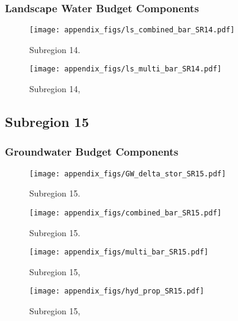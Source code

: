 \subsubsection{Landscape Water Budget Components}
\begin{figure}[ht]
\centerline{\texttt{[image: appendix\_figs/ls\_combined\_bar\_SR14.pdf]}}
\caption{\LSCombinedTextOne Subregion 14.\LSCombinedTextTwo}
\label{fig:LS_budget_SR14}
\end{figure}
\newpage

\begin{landscape}
\begin{figure}[ht]
\centerline{\texttt{[image: appendix\_figs/ls\_multi\_bar\_SR14.pdf]}}
\caption{\LSMultiTextOne Subregion 14,\LSMultiTextTwo}
\label{fig:multi_LS_budget_SR14}
\end{figure}
\newpage
\end{landscape}

\subsection{Subregion 15}
\subsubsection{Groundwater Budget Components}
\begin{figure}[h]
\centerline{\texttt{[image: appendix\_figs/GW\_delta\_stor\_SR15.pdf]}}
\caption{\GWBudgetText Subregion 15.}
\label{fig:delta_stor_SR15}
\end{figure}
\newpage

\begin{figure}[ht]
\centerline{\texttt{[image: appendix\_figs/combined\_bar\_SR15.pdf]}}
\caption{\GWCombinedTextOne Subregion 15.\GWCombinedTextTwo}
\label{fig:GW_budget_SR15}
\end{figure}
\newpage

\begin{landscape}
\begin{figure}[ht]
\centerline{\texttt{[image: appendix\_figs/multi\_bar\_SR15.pdf]}}
\caption{\GWMultiTextOne Subregion 15,\GWMultiTextTwo}
\label{fig:multi_GW_budget_SR15}
\end{figure}
\newpage

\begin{figure}[ht]
\centerline{\texttt{[image: appendix\_figs/hyd\_prop\_SR15.pdf]}}
\caption{\HydPropOne Subregion 15,\HydPropTwo}
\label{fig:hyd_prop_SR15}
\end{figure}
\newpage
\end{landscape}

